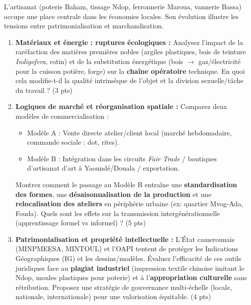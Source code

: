 \documentclass[11pt]{article}
\begin{document}
\begin{exercice}
L'artisanat (poterie Baham, tissage Ndop, ferronnerie Maroua, vannerie Bassa) occupe une place centrale dans les économies locales. Son évolution illustre les tensions entre patrimonialisation et marchandisation.

\begin{enumerate}
    \item \textbf{Matériaux et énergie : ruptures écologiques :} Analysez l'impact de la raréfaction des matières premières nobles (argiles plastiques, bois de teinture \textit{Indigofera}, rotin) et de la substitution énergétique (bois $\rightarrow$ gaz/électricité pour la cuisson potière, forge) sur la \textbf{chaîne opératoire} technique. En quoi cela modifie-t-il la qualité intrinsèque de l'objet et la division sexuelle/tâche du travail ? (3 pts)
    
    \item \textbf{Logiques de marché et réorganisation spatiale :} Comparez deux modèles de commercialisation : 
    \begin{itemize}
        \item Modèle A : Vente directe atelier/client local (marché hebdomadaire, commande sociale : dot, rites).
        \item Modèle B : Intégration dans les circuits \textit{Fair Trade} / boutiques d'artisanat d'art à Yaoundé/Douala / exportation.
    \end{itemize}
    Montrez comment le passage au Modèle B entraîne une \textbf{standardisation des formes}, une \textbf{désaisonnalisation de la production} et une \textbf{relocalisation des ateliers} en périphérie urbaine (ex: quartier Mvog-Ada, Fouda). Quels sont les effets sur la transmission intergénérationnelle (apprentissage formel vs informel) ? (5 pts)
    
    \item \textbf{Patrimonialisation et propriété intellectuelle :} L'État camerounais (MINPMEESA, MINTOUL) et l'OAPI tentent de protéger les Indications Géographiques (IG) et les dessins/modèles. Évaluez l'efficacité de ces outils juridiques face au \textbf{plagiat industriel} (impression textile chinoise imitant le Ndop, moules plastiques pour poterie) et à l'\textbf{appropriation culturelle} sans rétribution. Proposez une stratégie de gouvernance multi-échelle (locale, nationale, internationale) pour une valorisation équitable. (4 pts)
    

\end{enumerate}
\end{exercice}
\end{document}
